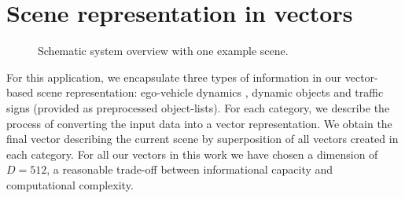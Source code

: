 \section{Scene representation in vectors}
\begin{figure}[t!]
	\centering
	\caption{Schematic system overview with one example scene.}\label{fig:sys}
\end{figure}
For this application, we encapsulate three types of information in our vector-based scene representation: ego-vehicle dynamics , dynamic objects and traffic signs (provided as preprocessed object-lists).
For each category, we describe the process of converting the input data into a vector representation.
We obtain the final vector describing the current scene by superposition of all vectors created in each category.
For all our vectors in this work we have chosen a dimension of $D=512$, a reasonable trade-off between informational capacity and computational complexity.\\
